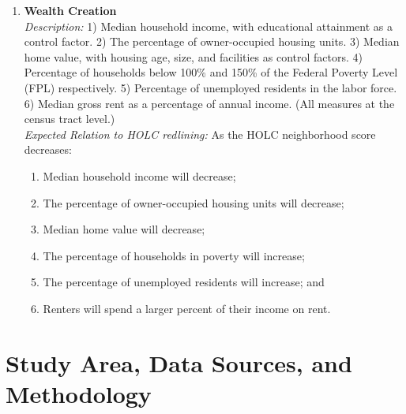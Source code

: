 \documentclass[paper=letter, fontsize=12pt]{scrartcl} %
\begin{document}
\begin{enumerate}
	\item \textbf{Wealth Creation}\\
	\textit{Description:} 1) Median household income, with educational attainment as a control factor. 2) The percentage of owner-occupied housing units. 3) Median home value, with housing age, size, and facilities as control factors. 4) Percentage of households below 100\% and 150\% of the Federal Poverty Level (FPL) respectively. 5) Percentage of unemployed residents in the labor force. 6) Median gross rent as a percentage of annual income. (All measures at the census tract level.)\\
	\textit{Expected Relation to HOLC redlining:} As the HOLC neighborhood score decreases:
	\begin{enumerate}
		\item Median household income will decrease;
		\item The percentage of owner-occupied housing units will decrease;
		\item Median home value will decrease;
		\item The percentage of households in poverty will increase;
		\item The percentage of unemployed residents will increase; and
		\item Renters will spend a larger percent of their income on rent.
	\end{enumerate}
\end{enumerate}

\section{Study Area, Data Sources, and Methodology}
\end{document}
